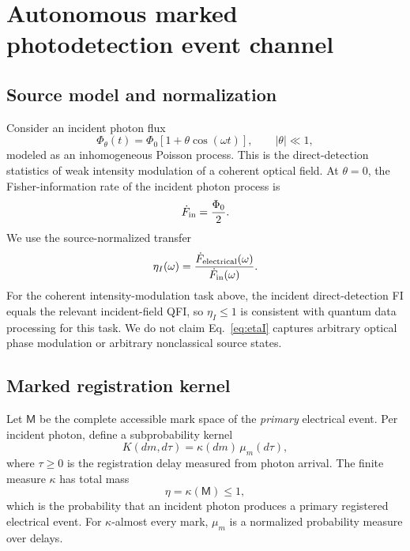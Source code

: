 \documentclass[aps,prapplied,preprint,nofootinbib]{revtex4-2}
\newcommand{\M}{\mathsf M}
\begin{document}
\section{Autonomous marked photodetection event channel}

\subsection{Source model and normalization}

Consider an incident photon flux
\begin{equation}
\Phi_\theta(t)=\Phi_0[1+\theta \cos(\omega t)],\qquad |\theta|\ll1,
\label{eq:source}
\end{equation}
modeled as an inhomogeneous Poisson process.  This is the direct-detection statistics of weak intensity modulation of a coherent optical field.  At $\theta=0$, the Fisher-information rate of the incident photon process is
\begin{equation}
\dot F_{\rm in}=\frac{\Phi_0}{2}.
\label{eq:inputFI}
\end{equation}
We use the source-normalized transfer
\begin{equation}
\eta_I(\omega)=\frac{\dot F_{\rm electrical}(\omega)}{\dot F_{\rm in}(\omega)}.
\label{eq:etaI}
\end{equation}
For the coherent intensity-modulation task above, the incident direct-detection FI equals the relevant incident-field QFI, so $\eta_I\le1$ is consistent with quantum data processing for this task.  We do not claim Eq.~\eqref{eq:etaI} captures arbitrary optical phase modulation or arbitrary nonclassical source states.

\subsection{Marked registration kernel}

Let $\M$ be the complete accessible mark space of the \emph{primary} electrical event.  Per incident photon, define a subprobability kernel
\begin{equation}
K(dm,d\tau)=\kappa(dm)\,\mu_m(d\tau),
\label{eq:kernel}
\end{equation}
where $\tau\ge0$ is the registration delay measured from photon arrival.  The finite measure $\kappa$ has total mass
\begin{equation}
\eta=\kappa(\M)\le1,
\label{eq:capture}
\end{equation}
which is the probability that an incident photon produces a primary registered electrical event.  For $\kappa$-almost every mark, $\mu_m$ is a normalized probability measure over delays.
\end{document}
